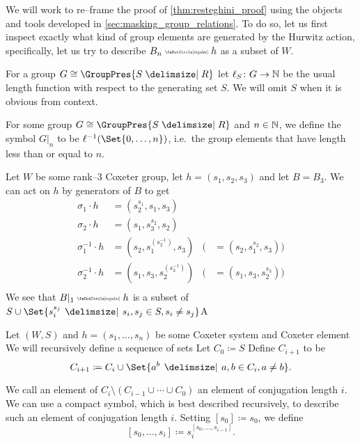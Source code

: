 We will work to re--frame the proof of \cref{thm:resteghini_proof} using the objects and tools developed in \cref{sec:masking_group_relations}.
To do so, let us first inspect exactly what kind of group elements are generated by the Hurwitz action, specifically, let us try to describe $B_n \codot h$ as a subset of $W$.

\begin{definition}
	For a group $G \cong \GroupPres{S \relations R}$ let $\ell_S \colon G \to \mathbb{N}$ be the usual length function with respect to the generating set $S$.
	We will omit $S$ when it is obvious from context.
\end{definition}
\begin{definition}
	For some group $G \cong \GroupPres{S \relations R}$ and $n \in \mathbb{N}$, we define the symbol $G|_n$ to be $\ell^{-1}(\Set{0, \ldots, n})$, i.e.~the group elements that have length less than or equal to $n$.
\end{definition}
\begin{example}
	Let $W$ be some rank--3 Coxeter group, let $h = (s_1,s_2,s_3)$ and let $B = B_3$.
	We can act on $h$ by generators of $B$ to get
	\begin{align*}
		\sigma_1 \cdot h      & = (s_2^{s_1}, s_1, s_3)                                                    \\
		\sigma_2 \cdot h      & = (s_1, s_3^{s_2}, s_2)                                                    \\
		\sigma_1^{-1} \cdot h & =  (s_2, s_1^{\left(s_2^{-1}\right)}, s_3) & ( & = (s_2, s_1^{s_2}, s_3) ) \\
		\sigma_2^{-1} \cdot h & = (s_1, s_3, s_2^{\left(s_3^{-1}\right)})  & ( & = (s_1, s_3, s_2^{s_3}))  \\
	\end{align*}
	We see that $B|_1 \codot h$ is a subset of $S \cup \Set{s_i^{s_j} \given s_i,s_j \in S, s_i \neq s_j} $A
	\label{ex:rank_3_hurwitz_action}
\end{example}

\begin{definition}
	Let $(W,S)$ and $h = (s_1, \ldots, s_n)$ be some Coxeter system and Coxeter element
	We will recursively define a sequence of sets
	Let $C_0 \coloneqq S$
	Define  $C_{i+1}$ to be
	\[
		C_{i+1} \coloneqq C_i \cup \Set{a^{b} \given a,b \in C_i, a \neq b}
		.\]
\end{definition}
\begin{definition}
	We call an element of $C_i \setminus (C_{i-1} \cup \cdots \cup C_0)$ an element of conjugation length $i$.
	We can use a compact symbol, which is best described recursively, to describe such an element of conjugation length $i$.
	Setting $[s_0] \coloneqq s_0$, we define
	\[
		[s_0, \ldots, s_i] \coloneqq s_i^{[s_0, \ldots, s_{i-1}]}
		.\]
\end{definition}

